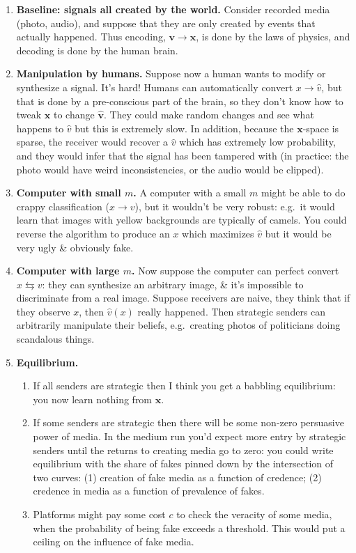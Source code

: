 \documentclass[
  10pt,
  letterpaper,
  DIV=11,
  numbers=noendperiod,
  oneside]{scrartcl}
\providecommand{\tightlist}{%
  \setlength{\itemsep}{0pt}\setlength{\parskip}{0pt}}\usepackage{longtable,booktabs,array}
\newcommand{\bm}[1]{\boldsymbol{#1}}
\begin{document}
\begin{enumerate}
\def\labelenumi{\arabic{enumi}.}
\tightlist
\item
  \textbf{Baseline: signals all created by the world.} Consider recorded
  media (photo, audio), and suppose that they are only created by events
  that actually happened. Thus encoding, \(\bm{v}\rightarrow\bm{x}\), is
  done by the laws of physics, and decoding is done by the human brain.
\item
  \textbf{Manipulation by humans.} Suppose now a human wants to modify
  or synthesize a signal. It's hard! Humans can automatically convert
  \(x\rightarrow\hat{v}\), but that is done by a pre-conscious part of
  the brain, so they don't know how to tweak \(\bm{x}\) to change
  \(\hat{\bm{v}}\). They could make random changes and see what happens
  to \(\hat{v}\) but this is extremely slow. In addition, because the
  \(\bm{x}\)-space is sparse, the receiver would recover a \(\hat{v}\)
  which has extremely low probability, and they would infer that the
  signal has been tampered with (in practice: the photo would have weird
  inconsistencies, or the audio would be clipped).
\item
  \textbf{Computer with small \(m\).} A computer with a small \(m\)
  might be able to do crappy classification (\(x\rightarrow v\)), but it
  wouldn't be very robust: e.g.~it would learn that images with yellow
  backgrounds are typically of camels. You could reverse the algorithm
  to produce an \(x\) which maximizes \(\hat{v}\) but it would be very
  ugly \& obviously fake.
\item
  \textbf{Computer with large \(m\).} Now suppose the computer can
  perfect convert \(x\leftrightarrows v\): they can synthesize an
  arbitrary image, \& it's impossible to discriminate from a real image.
  Suppose receivers are naive, they think that if they observe \(x\),
  then \(\hat{v}(x)\) really happened. Then strategic senders can
  arbitrarily manipulate their beliefs, e.g.~creating photos of
  politicians doing scandalous things.
\item
  \textbf{Equilibrium.}

  \begin{enumerate}
  \def\labelenumii{\arabic{enumii}.}
  \tightlist
  \item
    If all senders are strategic then I think you get a babbling
    equilibrium: you now learn nothing from \(\bm{x}\).
  \item
    If some senders are strategic then there will be some non-zero
    persuasive power of media. In the medium run you'd expect more entry
    by strategic senders until the returns to creating media go to zero:
    you could write equilibrium with the share of fakes pinned down by
    the intersection of two curves: (1) creation of fake media as a
    function of credence; (2) credence in media as a function of
    prevalence of fakes.
  \item
    Platforms might pay some cost \(c\) to check the veracity of some
    media, when the probability of being fake exceeds a threshold. This
    would put a ceiling on the influence of fake media.
  \end{enumerate}
\end{enumerate}
\end{document}
